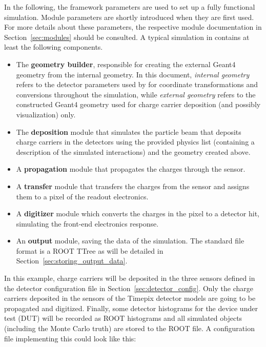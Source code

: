 In the following, the framework parameters are used to set up a fully functional simulation.
Module parameters are shortly introduced when they are first used.
For more details about these parameters, the respective module documentation in Section~\ref{sec:modules} should be consulted.
A typical simulation in \apsq contains at least the following components.
\begin{itemize}

\item The \textbf{geometry builder}, responsible for creating the external Geant4 geometry from the internal geometry.
In this document, \emph{internal geometry} refers to the detector parameters used by \apsq for coordinate transformations and conversions throughout the simulation, while \emph{external geometry} refers to the constructed Geant4 geometry used for charge carrier deposition (and possibly visualization) only.
\item The \textbf{deposition} module that simulates the particle beam that deposits charge carriers in the detectors using the provided physics list (containing a description of the simulated interactions) and the geometry created above.
\item A \textbf{propagation} module that propagates the charges through the sensor.
\item A \textbf{transfer} module that transfers the charges from the sensor and assigns them to a pixel of the readout electronics.
\item A \textbf{digitizer} module which converts the charges in the pixel to a detector hit, simulating the front-end electronics response.
\item An \textbf{output} module, saving the data of the simulation.
The \apsq standard file format is a ROOT TTree as will be detailed in Section~\ref{sec:storing_output_data}.
\end{itemize}

In this example, charge carriers will be deposited in the three sensors defined in the detector configuration file in Section~\ref{sec:detector_config}.
Only the charge carriers deposited in the sensors of the Timepix detector models are going to be propagated and digitized.
Finally, some detector histograms for the device under test (DUT) will be recorded as ROOT histograms and all simulated objects (including the Monte Carlo truth) are stored to the \apsq ROOT file.
A configuration file implementing this could look like this:
\inputminted[frame=single,framesep=3pt,breaklines=true,tabsize=2,linenos]{ini}{../../etc/manual.conf}

